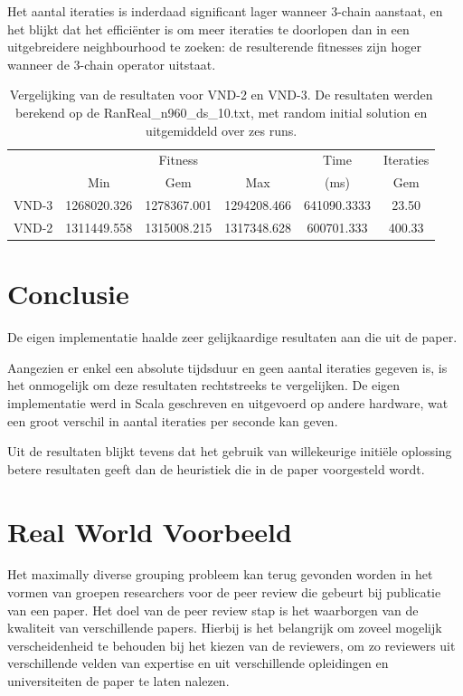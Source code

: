 \documentclass[pdftex,12pt,a4paper]{article}
\begin{document}
Het aantal iteraties is inderdaad significant lager wanneer 3-chain aanstaat, en het blijkt dat het effici\"enter is om meer iteraties te doorlopen dan in een uitgebreidere neighbourhood te zoeken: de resulterende fitnesses zijn hoger wanneer de 3-chain operator uitstaat.


\begin{table}[h]
\centering
\begin{tabular}{l|c|c|c|c|c}
& \multicolumn{3}{c|}{Fitness} & Time & Iteraties \\
& Min & Gem & Max & (ms) & Gem \\\hline 
VND-3 & 1268020.326	& 1278367.001 & 1294208.466	& 641090.3333 & 23.50\\
VND-2 & 1311449.558 &	1315008.215 &	1317348.628 &	600701.333 & 400.33
\end{tabular}
\caption{Vergelijking van de resultaten voor VND-2 en VND-3. De resultaten werden berekend op de RanReal\_n960\_ds\_10.txt, met random initial solution en uitgemiddeld over zes runs.}
\label{table:vnd3vsvnd2}
\end{table}

\section{Conclusie}
De eigen implementatie haalde zeer gelijkaardige resultaten aan die uit de paper. 

Aangezien er enkel een absolute tijdsduur en geen aantal iteraties gegeven is, is het onmogelijk om deze resultaten rechtstreeks te vergelijken. De eigen implementatie werd in Scala geschreven en uitgevoerd op andere hardware, wat een groot verschil in aantal iteraties per seconde kan geven.

Uit de resultaten blijkt tevens dat het gebruik van willekeurige initi\"ele oplossing betere resultaten geeft dan de heuristiek die in de paper voorgesteld wordt. 

\section{Real World Voorbeeld}

Het maximally diverse grouping probleem kan terug gevonden worden in het vormen van groepen researchers voor de peer review die gebeurt bij publicatie van een paper. Het doel van de peer review stap is het waarborgen van de kwaliteit van verschillende papers. Hierbij is het belangrijk om zoveel mogelijk verscheidenheid te behouden bij het kiezen van de reviewers, om zo reviewers uit verschillende velden van expertise en uit verschillende opleidingen en universiteiten de paper te laten nalezen.
\end{document}
